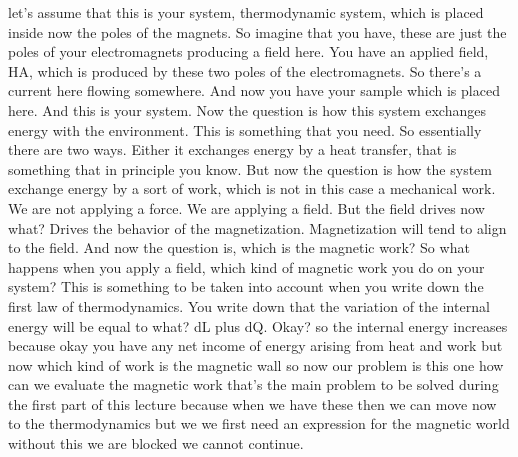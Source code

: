 let's assume that this is your system, thermodynamic system, which is placed inside now the poles of the magnets. So imagine that you have, these are just the poles of your electromagnets producing a field here. You have an applied field, HA, which is produced by these two poles of the electromagnets. So there's a current here flowing somewhere. And now you have your sample which is placed here. And this is your system. Now the question is how this system exchanges energy with the environment. This is something that you need. So essentially there are two ways. Either it exchanges energy by a heat transfer, that is something that in principle you know. But now the question is how the system exchange energy by a sort of work, which is not in this case a mechanical work. We are not applying a force. We are applying a field. But the field drives now what? Drives the behavior of the magnetization. Magnetization will tend to align to the field. And now the question is, which is the magnetic work? So what happens when you apply a field, which kind of magnetic work you do on your system? This is something to be taken into account when you write down the first law of thermodynamics. You write down that the variation of the internal energy will be equal to what? dL plus dQ. Okay? so the internal energy increases because okay you have any net income of energy arising from heat and work but now which kind of work is the magnetic wall so now our problem is this one how can we evaluate the magnetic work that's the main problem to be solved during the first part of this lecture because when we have these then we can move now to the thermodynamics but we we first need an expression for the magnetic world without this we are blocked we cannot continue.

